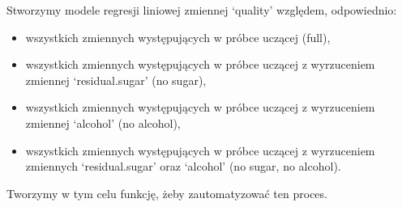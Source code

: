 \documentclass[
]{article}
\providecommand{\tightlist}{%
  \setlength{\itemsep}{0pt}\setlength{\parskip}{0pt}}
\begin{document}
Stworzymy modele regresji liniowej zmiennej `quality' względem,
odpowiednio:

\begin{itemize}
\tightlist
\item
  wszystkich zmiennych występujących w próbce uczącej (full),
\item
  wszystkich zmiennych występujących w próbce uczącej z wyrzuceniem
  zmiennej `residual.sugar' (no sugar),
\item
  wszystkich zmiennych występujących w próbce uczącej z wyrzuceniem
  zmiennej `alcohol' (no alcohol),
\item
  wszystkich zmiennych występujących w próbce uczącej z wyrzuceniem
  zmiennych `residual.sugar' oraz `alcohol' (no sugar, no alcohol).
\end{itemize}

Tworzymy w tym celu funkcję, żeby zautomatyzować ten proces.
\end{document}
